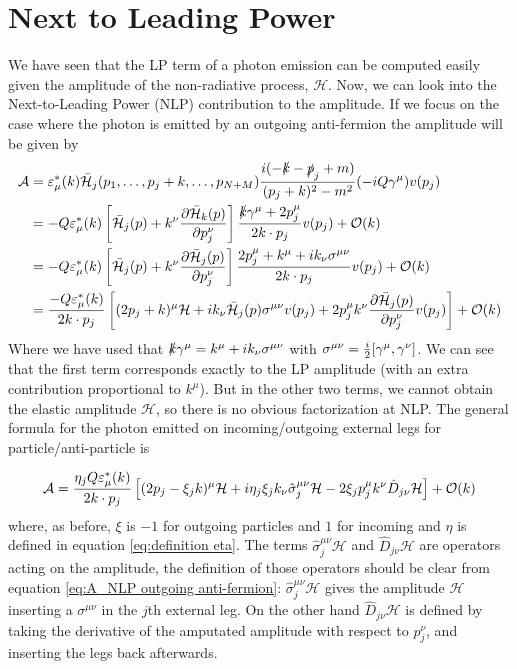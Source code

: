 \documentclass{article}
\newcommand{\s}[1]{\slashed #1}
\begin{document}
\section{Next to Leading Power}
We have seen that the LP term of a photon emission can be computed
easily given the amplitude of the non-radiative process, $\mathcal{H}$.
Now, we can look into the Next-to-Leading Power (NLP) contribution to the amplitude.
If we focus on the case where the photon is emitted by an outgoing anti-fermion
the amplitude will be given by
\begin{align}\label{eq:A_NLP outgoing anti-fermion}
	\mathcal{A} &
	= \varepsilon^*_\mu(k)
	\bar{\mathcal{H}}_j(p_1, \ldots, p_j+k, \ldots, p_{N+M})
	\frac{i(-\s{k} - \s{p}_j + m)}{(p_j + k)^2 - m^2} (-iQ \gamma^\mu) v(p_j)\nonumber\\&
	= - Q \varepsilon^*_\mu(k)
	\left[\bar{\mathcal{H}}_j(p) + k^\nu \pdv{\bar{\mathcal{H}}_k(p)}{p_j^\nu}\right]
	\frac{\s{k}\gamma^\mu + 2p_j^\mu}{2k \cdot p_j} v(p_j)
	+ \order{k}\nonumber\\&
	= - Q \varepsilon^*_\mu(k)
	\left[\bar{\mathcal{H}}_j(p) + k^\nu \pdv{\bar{\mathcal{H}}_j(p)}{p_j^\nu}\right]
	\frac{2p_j^\mu + k^\mu + i k_\nu \sigma^{\mu\nu}}{2k \cdot p_j} v(p_j)
	+ \order{k}\nonumber\\&
	= \frac{- Q \varepsilon^*_\mu(k)}{2k \cdot p_j}
	\left[
		(2p_j + k)^\mu \mathcal{H}
		+ i k_\nu \bar{\mathcal{H}}_j(p) \sigma^{\mu\nu} v(p_j)
		+ 2p_j^\mu k^\nu \pdv{\bar{\mathcal{H}}_j(p)}{p_j^\nu} v(p_j)
	\right]
	+ \order{k}
\end{align}
Where we have used that $\s{k}\gamma^\mu = k^\mu + i k_\nu \sigma^{\mu\nu}$
with $\sigma^{\mu\nu} = \frac{i}{2}\comm{\gamma^\mu}{\gamma^\nu}$.
We can see that the first term corresponds exactly to the LP amplitude
(with an extra contribution proportional to $k^\mu$).
But in the other two terms, we cannot obtain the elastic amplitude $\mathcal{H}$,
so there is no obvious factorization at NLP.
The general formula for the photon emitted on incoming/outgoing external legs
for particle/anti-particle is

\begin{equation*}
	\mathcal{A}
	= \frac{\eta_j Q \varepsilon^*_\mu(k)}{2k \cdot p_j}
	\left[
		(2p_j - \xi_j k)^\mu \mathcal{H}
		+ i\eta_j\xi_j k_\nu \hat{\sigma}_j^{\mu\nu}\mathcal{H}
		- 2\xi_j p_j^\mu k^\nu \hat{D}_{j\nu}\mathcal{H}
	\right]
	+ \order{k}
\end{equation*}
where, as before, $\xi$ is $-1$ for outgoing particles and $1$ for incoming
and $\eta$ is defined in equation \eqref{eq:definition eta}.
The terms $\hat{\sigma}_j^{\mu\nu}\mathcal{H}$ and $\hat{D}_{j\nu}\mathcal{H}$
are operators acting on the amplitude,
the definition of those operators should be clear from
equation \eqref{eq:A_NLP outgoing anti-fermion}:
$\hat{\sigma}_j^{\mu\nu}\mathcal{H}$ gives the amplitude $\mathcal{H}$
inserting a $\sigma^{\mu\nu}$ in the $j$th external leg.
On the other hand $\hat{D}_{j\nu}\mathcal{H}$ is defined by taking the derivative of the amputated amplitude with respect to $p^\nu_j$, and inserting the legs back afterwards.
\end{document}
